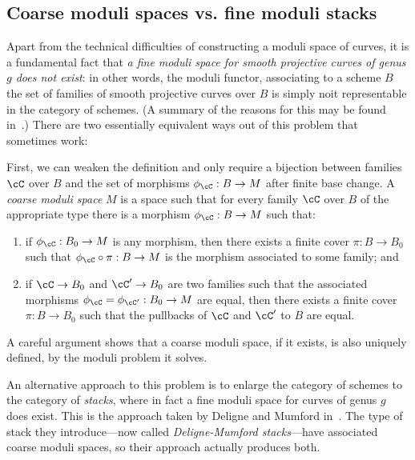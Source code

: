 \subsection{Coarse moduli spaces vs. fine moduli stacks}

Apart from the technical difficulties of constructing a moduli space of curves, it is a fundamental fact that \emph{a fine moduli space for smooth projective curves of genus $g$ does not exist}: in other words, the moduli functor, associating to a scheme $B$ the set of families of smooth projective curves over $B$ is simply noit representable in the category of schemes. (A summary of the reasons for this may be found in~\cite{GeomSchemes}.)
There are two essentially equivalent ways out of this problem that sometimes work:

First, we can weaken the definition and only require a bijection between families $\cC$ over $B$ and the set of morphisms $\phi_\cC : B \to M$ after finite base change. A \emph{coarse moduli space} $M$ is a space such that for every family  $\cC$ over $B$ 
of the appropriate type there is a morphism $\phi_\cC : B \to M$ such that:

\begin{enumerate}
\item if $\phi_\cC : B_0 \to M$ is any morphism, then there exists a finite cover $\pi : B \to B_0$ such that $\phi_\cC \circ \pi : B \to M$ is the morphism associated to some family; and
\item if $\cC \to B_0$ and $\cC' \to B_0$ are two families such that the associated morphisms $\phi_\cC = \phi_{\cC'} : B_0 \to M$ are equal, then there exists a finite cover $\pi : B \to B_0$ such that the pullbacks of $\cC$ and $\cC'$ to $B$ are equal.
\end{enumerate}

A careful argument shows that a coarse moduli space, if it exists, is also uniquely defined, by the moduli problem it solves.

An alternative approach to this problem is to enlarge the category of schemes to the category of  \emph{stacks}, where in fact a fine moduli space for curves of genus $g$ does exist. This is the approach taken by Deligne and Mumford in~\cite{Deligne-Mumford}. The type of stack they introduce---now called \emph{Deligne-Mumford stacks}---have associated coarse moduli spaces, so their approach actually produces both.


